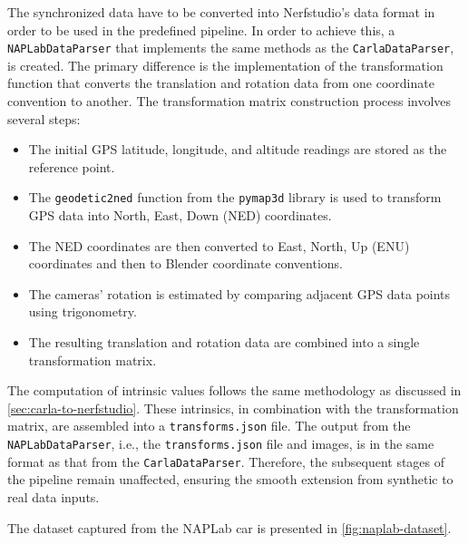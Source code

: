 The synchronized data have to be converted into Nerfstudio's data format in order to be used in the predefined pipeline. In order to achieve this, a \texttt{NAPLabDataParser} that implements the same methods as the \texttt{CarlaDataParser}, is created. The primary difference is the implementation of the transformation function that converts the translation and rotation data from one coordinate convention to another. The transformation matrix construction process involves several steps:

\begin{itemize}
    \item The initial GPS latitude, longitude, and altitude readings are stored as the reference point.
    \item The \texttt{geodetic2ned} function from the \texttt{pymap3d} library \cite{Hirsch_PyGemini} is used to transform GPS data into North, East, Down (NED) coordinates.
    \item The NED coordinates are then converted to East, North, Up (ENU) coordinates and then to Blender coordinate conventions.
    \item The cameras' rotation is estimated by comparing adjacent GPS data points using trigonometry.
    \item The resulting translation and rotation data are combined into a single transformation matrix.
\end{itemize}

The computation of intrinsic values follows the same methodology as discussed in \autoref{sec:carla-to-nerfstudio}. These intrinsics, in combination with the transformation matrix, are assembled into a \texttt{transforms.json} file. The output from the \texttt{NAPLabDataParser}, i.e., the \texttt{transforms.json} file and images, is in the same format as that from the \texttt{CarlaDataParser}. Therefore, the subsequent stages of the pipeline remain unaffected, ensuring the smooth extension from synthetic to real data inputs.

The dataset captured from the NAPLab car is presented in \autoref{fig:naplab-dataset}.








